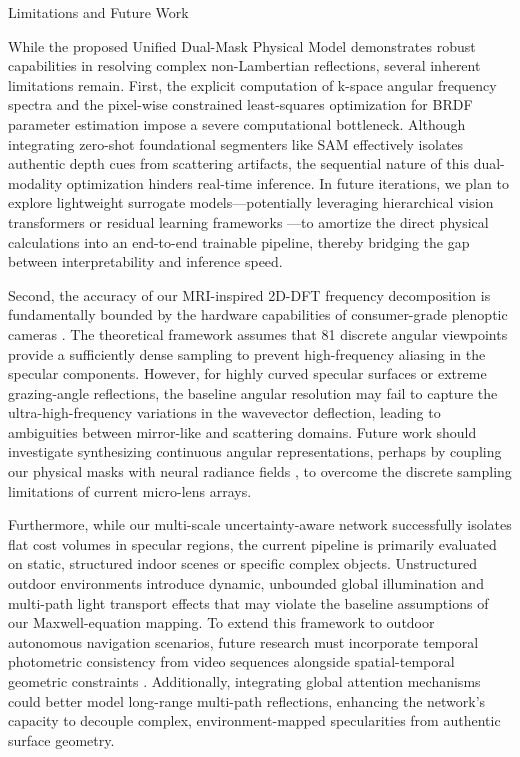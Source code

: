 \documentclass[lettersize,journal]{IEEEtran}
\begin{document}
Limitations and Future Work

While the proposed Unified Dual-Mask Physical Model demonstrates robust capabilities in resolving complex non-Lambertian reflections, several inherent limitations remain. First, the explicit computation of k-space angular frequency spectra and the pixel-wise constrained least-squares optimization for BRDF parameter estimation impose a severe computational bottleneck. Although integrating zero-shot foundational segmenters like SAM \cite{kirillov2023} effectively isolates authentic depth cues from scattering artifacts, the sequential nature of this dual-modality optimization hinders real-time inference. In future iterations, we plan to explore lightweight surrogate models—potentially leveraging hierarchical vision transformers \cite{liu2021} or residual learning frameworks \cite{he2016}—to amortize the direct physical calculations into an end-to-end trainable pipeline, thereby bridging the gap between interpretability and inference speed.

Second, the accuracy of our MRI-inspired 2D-DFT frequency decomposition is fundamentally bounded by the hardware capabilities of consumer-grade plenoptic cameras \cite{ng2005,ng2006}. The theoretical framework assumes that 81 discrete angular viewpoints provide a sufficiently dense sampling to prevent high-frequency aliasing in the specular components. However, for highly curved specular surfaces or extreme grazing-angle reflections, the baseline angular resolution may fail to capture the ultra-high-frequency variations in the wavevector deflection, leading to ambiguities between mirror-like and scattering domains. Future work should investigate synthesizing continuous angular representations, perhaps by coupling our physical masks with neural radiance fields \cite{ng2022}, to overcome the discrete sampling limitations of current micro-lens arrays.

Furthermore, while our multi-scale uncertainty-aware network successfully isolates flat cost volumes in specular regions, the current pipeline is primarily evaluated on static, structured indoor scenes or specific complex objects. Unstructured outdoor environments introduce dynamic, unbounded global illumination and multi-path light transport effects that may violate the baseline assumptions of our Maxwell-equation mapping. To extend this framework to outdoor autonomous navigation scenarios, future research must incorporate temporal photometric consistency from video sequences \cite{godard2019} alongside spatial-temporal geometric constraints \cite{shiNone}. Additionally, integrating global attention mechanisms \cite{vaswani2017} could better model long-range multi-path reflections, enhancing the network's capacity to decouple complex, environment-mapped specularities from authentic surface geometry.
\end{document}
